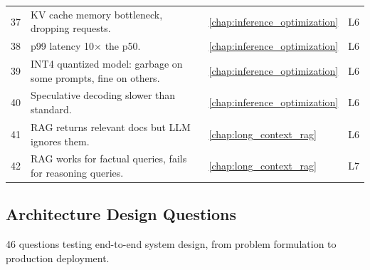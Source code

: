 \begin{longtable}{rp{8.5cm}ll}
37 & KV cache memory bottleneck, dropping requests. & \ref{chap:inference_optimization} & L6 \\
38 & p99 latency 10$\times$ the p50. & \ref{chap:inference_optimization} & L6 \\
39 & INT4 quantized model: garbage on some prompts, fine on others. & \ref{chap:inference_optimization} & L6 \\
40 & Speculative decoding slower than standard. & \ref{chap:inference_optimization} & L6 \\
41 & RAG returns relevant docs but LLM ignores them. & \ref{chap:long_context_rag} & L6 \\
42 & RAG works for factual queries, fails for reasoning queries. & \ref{chap:long_context_rag} & L7 \\
\end{longtable}

\subsection{Architecture Design Questions}

46 questions testing end-to-end system design, from problem formulation to production deployment.

